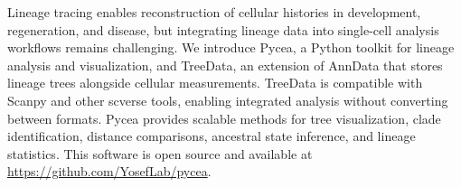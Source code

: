 Lineage tracing enables reconstruction of cellular histories in development, regeneration, and disease, but integrating lineage data into single-cell analysis workflows remains challenging. We introduce Pycea, a Python toolkit for lineage analysis and visualization, and TreeData, an extension of AnnData that stores lineage trees alongside cellular measurements. TreeData is compatible with Scanpy and other scverse tools, enabling integrated analysis without converting between formats. Pycea provides scalable methods for tree visualization, clade identification, distance comparisons, ancestral state inference, and lineage statistics. This software is open source and available at \url{https://github.com/YosefLab/pycea}.